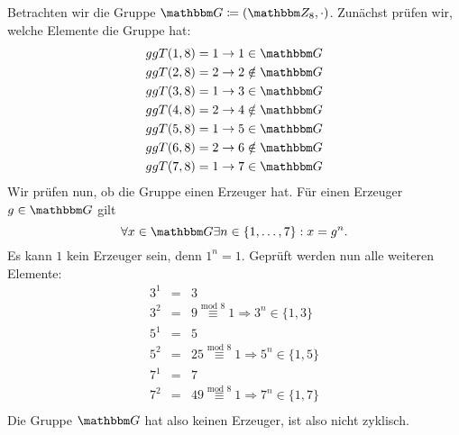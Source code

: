 \begin{beispiel}
\label{bsp:azyklische_gruppe}
Betrachten wir die Gruppe $\G \coloneqq (\Z{8}, \cdot)$. Zunächst prüfen wir, welche
Elemente die Gruppe hat:
\begin{eqnarray*}
ggT(1, 8) = 1 \rightarrow 1 \in \G\\
ggT(2, 8) = 2 \rightarrow 2 \notin \G\\
ggT(3, 8) = 1 \rightarrow 3 \in \G\\
ggT(4, 8) = 2 \rightarrow 4 \notin \G\\
ggT(5, 8) = 1 \rightarrow 5 \in \G\\
ggT(6, 8) = 2 \rightarrow 6 \notin \G\\
ggT(7, 8) = 1 \rightarrow 7 \in \G\\
\end{eqnarray*}
Wir prüfen nun, ob die Gruppe einen Erzeuger hat. Für einen Erzeuger
$g \in \G$ gilt 
\[
\forall x \in \G \exists n\in\{1,\dots, 7\}: x = g^n.
\]
Es kann $1$ kein Erzeuger sein, denn $1^n=1$. Geprüft werden nun alle
weiteren Elemente:
\begin{eqnarray*}
  3^1 & = & 3\\
  3^2 & = & 9 \stackrel{\text{mod 8}}{\equiv} 1 \Rightarrow 3^n\in\{1, 3\}\\
  5^1 & = & 5\\
  5^2 & = & 25 \stackrel{\text{mod 8}}{\equiv} 1 \Rightarrow 5^n\in\{1, 5\}\\
  7^1 & = & 7\\
  7^2 & = & 49 \stackrel{\text{mod 8}}{\equiv} 1 \Rightarrow 7^n\in\{1, 7\}\\
\end{eqnarray*}
Die Gruppe $\G$ hat also keinen Erzeuger, ist also nicht zyklisch.
\end{beispiel}

